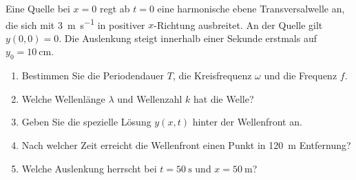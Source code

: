 \begin{ExerciseBlock}
Eine Quelle bei $x=0$ regt ab $t=0$ eine harmonische ebene Transversalwelle an, die sich mit \qty{3}{\metre\per\second} in positiver $x$-Richtung ausbreitet. An der Quelle gilt $y(0,0)=0$. Die Auslenkung steigt innerhalb einer Sekunde erstmals auf $y_0=\qty{10}{\centi\metre}$.
\begin{enumerate}
\item Bestimmen Sie die Periodendauer $T$, die Kreisfrequenz $\omega$ und die Frequenz $f$.
\item Welche Wellenlänge $\lambda$ und Wellenzahl $k$ hat die Welle?
\item Geben Sie die spezielle Lösung $y(x,t)$ hinter der Wellenfront an.
\item Nach welcher Zeit erreicht die Wellenfront einen Punkt in \qty{120}{\metre} Entfernung?
\item Welche Auslenkung herrscht bei $t=\qty{50}{\second}$ und $x=\qty{50}{\metre}$?
\end{enumerate}
\end{ExerciseBlock}
